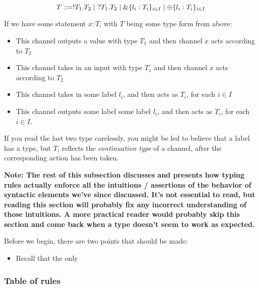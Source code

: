 $$
T ::= !T_1.T_2 \mid \ ?T_1.T_2 \mid \&\{l_i : T_i\}_{i \in I} \mid \oplus \{l_i : T_i\}_{i \in I}
$$

If we have some statement $x : T$, with $T$ being some type form from above:
\begin{itemize}
    \item This channel outputs a value with type $T_1$ and then channel $x$ acts according to $T_2$
    \item This channel takes in an input with type $T_1$ and then channel $x$ acts according to $T_2$
    \item This channel takes in some label $l_i$, and then acts as $T_i$, for each $i \in I$
    \item This channel outputs some label some label $l_i$, and then acts as $T_i$, for each $i \in I$.
\end{itemize}

If you read the last two type carelessly, you might be led to believe that a label has a type, but $T_i$ reflects the \textit{continuation type} of a channel, after the corresponding action has been taken.

\textbf{Note: The rest of this subsection discusses and presents how typing rules actually enforce all the intuitions / assertions of the behavior of syntactic elements we've since discussed. It's not essential to read, but reading this section will probably fix any incorrect understanding of those intuitions. A more practical reader would probably skip this section and come back when a type doesn't seem to work as expected.}

Before we begin, there are two points that should be made:
\begin{itemize}
    \item Recall that the only 
\end{itemize}

\subsubsection{Table of rules}
